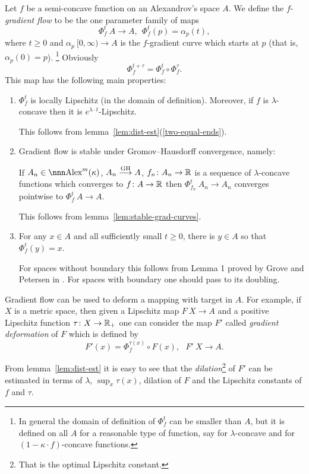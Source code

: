 \documentclass{article}
\begin{document}
Let $f$ be a semi-concave function on an Alexandrov's space $A$. 
We define the $f$-\emph{gradient flow} to be the one parameter family of maps 
$$\Phi^t_f\:A\to A, \ \ \Phi^t_f(p)=\alpha_p(t),$$
where $t\ge 0$ and $\alpha_p\:[0,\infty)\to A$ is the $f$-gradient curve which
starts at $p$ (that is, $\alpha_p(0)=p$).
\footnote{In general the domain of definition of $\Phi^t_f$ can be smaller than $A$, 
but it is defined on all $A$ for a reasonable type of function, say for $\lambda$-concave and for $(1-\kappa{\cdot}f)$-concave functions.}
Obviously
$$ \Phi^{t+\tau}_f=\Phi^t_f\circ\Phi^\tau_f.$$
This map has the following main properties:
\begin{enumerate}
\item $\Phi^t_f$ is locally Lipschitz (in the domain of definition). 
Moreover, if $f$ is $\lambda$-concave then it is $e^{\lambda{\cdot}t}$-Lipschitz.

This follows from lemma~\ref{lem:dist-est}(\ref{two-equal-ends}).

\item Gradient flow is stable under Gromov--Hausdorff convergence, namely:

If $A_n\in \Alex^m(\kappa)$, $A_n\GHto A$, $f_n\colon A_n\to\mathbb{R}$ is a sequence of
$\lambda$-concave functions which converges to $f\colon A\to \mathbb{R}$ then
$\Phi_{f_n}^t\:A_n\to A_n$ converges pointwise to $\Phi_f^t\:A\to A$.

This follows  from lemma~\ref{lem:stable-grad-curves}.

\item\label{grad-onto} For any $x\in A$ and all sufficiently small $t\ge 0$, there is $y\in A$ so that 
$\Phi_f^t(y)=x$.

For spaces without boundary this follows from Lemma 1 proved by Grove and Petersen in \cite{grove-petersen:rad-sphere}.
For spaces with boundary one should pass to its doubling.
\end{enumerate}


Gradient flow can be used to deform a mapping with target in $A$. 
For example, if $X$ is a metric space, then given a Lipschitz map $F\:X\to A$ and
a positive Lipschitz function $\tau\colon X\to \mathbb{R}_+$ one can consider the map $F'$ called
\emph{gradient deformation} of $F$ which is defined by
$$F'(x)=\Phi_f^{\tau(x)}\circ F(x),\ \ \ F'\:X\to A.$$

From lemma~\ref{lem:dist-est} it is easy to see that the \emph{dilation}\footnote{That is the optimal Lipschitz constant.}
of $F'$
can be estimated in terms of $\lambda$, $\sup_x\tau(x)$, dilation of $F$ and the
Lipschitz constants of $f$ and $\tau$.
\end{document}
